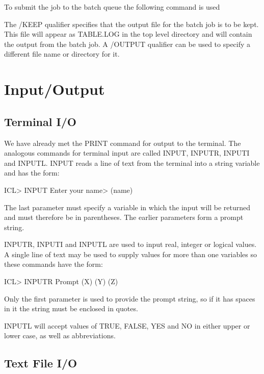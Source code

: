\documentclass[twoside,11pt,nolof,chapters]{starlink}
\begin{document}
To submit the job to the batch queue the following command is used
The /KEEP qualifier specifies that the output file for the batch job is
to be kept. This file will appear as TABLE.LOG in the top level directory
and will contain the output from the batch job. A /OUTPUT qualifier
can be used to specify a different file name or directory for it.

\chapter{Input/Output}

\section{Terminal I/O}

We have already met the PRINT command for output to the terminal. The analogous
commands for terminal input are called INPUT, INPUTR, INPUTI and INPUTL.
INPUT reads a line of text from the terminal into a string variable and
has the form:
\begin{terminalv}

   ICL> INPUT Enter your name>  (name)

\end{terminalv}
The last parameter must specify a variable in which the input will be returned
and must therefore be in parentheses. The earlier parameters form a prompt
string.

INPUTR, INPUTI and INPUTL are used to input real, integer or logical values.
A single line of text may be used to supply values for more than one variables
so these commands have the form:
\begin{terminalv}

   ICL> INPUTR  Prompt  (X)  (Y)  (Z)

\end{terminalv}
Only the first parameter is used to provide the prompt string, so if it
has spaces in it the string must be enclosed in quotes.

INPUTL will accept values of TRUE, FALSE, YES and NO in either upper or
lower case, as well as abbreviations.

\section{Text File I/O}
\end{document}
